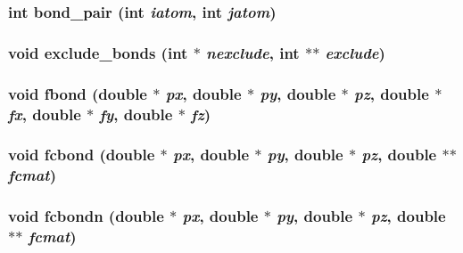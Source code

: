 \subsubsection{\setlength{\rightskip}{0pt plus 5cm}int bond\_\-pair (int {\em iatom}, int {\em jatom})}\label{md__fmorse_8c_2168907e69abb2e97f7545d9711705b9}


\subsubsection{\setlength{\rightskip}{0pt plus 5cm}void exclude\_\-bonds (int $\ast$ {\em nexclude}, int $\ast$$\ast$ {\em exclude})}\label{md__fmorse_8c_46169ae44ea65dc813207ee4b4cd80b6}


\subsubsection{\setlength{\rightskip}{0pt plus 5cm}void fbond (double $\ast$ {\em px}, double $\ast$ {\em py}, double $\ast$ {\em pz}, double $\ast$ {\em fx}, double $\ast$ {\em fy}, double $\ast$ {\em fz})}\label{md__fmorse_8c_a2f60a731a1874138678bec645ec2c88}


\subsubsection{\setlength{\rightskip}{0pt plus 5cm}void fcbond (double $\ast$ {\em px}, double $\ast$ {\em py}, double $\ast$ {\em pz}, double $\ast$$\ast$ {\em fcmat})}\label{md__fmorse_8c_dfff8c410a36b00415ed39eb81e9f844}


\subsubsection{\setlength{\rightskip}{0pt plus 5cm}void fcbondn (double $\ast$ {\em px}, double $\ast$ {\em py}, double $\ast$ {\em pz}, double $\ast$$\ast$ {\em fcmat})}\label{md__fmorse_8c_4b8600806c78fa8d27460b3a81ed87f6}


